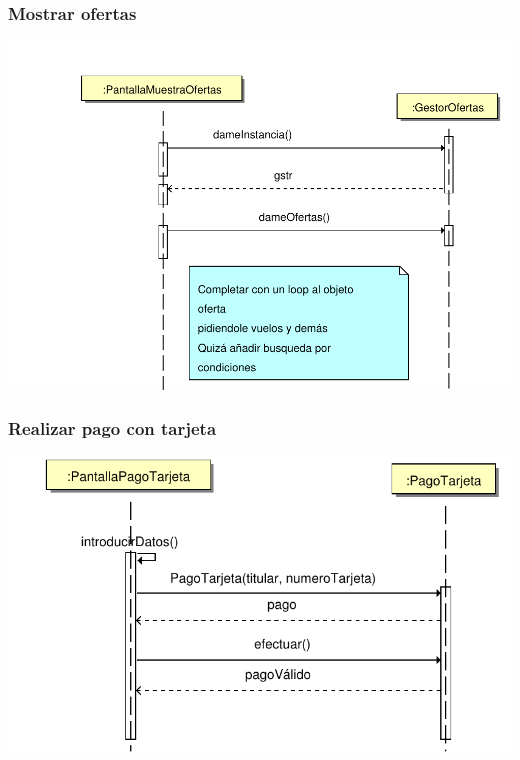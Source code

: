 \documentclass[11pt, a4paper, twoside, titlepage]{article}
\begin{document}
			\subsubsection{Mostrar ofertas}
				\begin{center}
					\includegraphics[scale=.7]{diseno/diagramas/mostrarofertas.pdf}
				\end{center}

			\subsubsection{Realizar pago con tarjeta}
				\begin{center}
					\includegraphics[scale=.7]{diseno/diagramas/pagotarjeta.pdf}
				\end{center}
\end{document}
